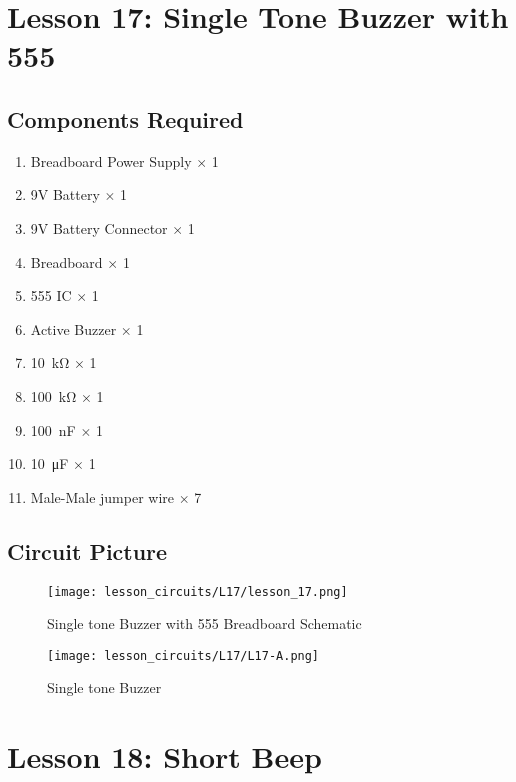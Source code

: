 \section{Lesson 17: Single Tone Buzzer with 555}
\subsection{Components Required}
\begin{enumerate}
    \item Breadboard Power Supply $\times$ 1
    \item 9V Battery $\times$ 1
    \item 9V Battery Connector $\times$ 1
    \item Breadboard $\times$ 1
    \item 555 IC $\times$ 1
    \item Active Buzzer $\times$ 1
    \item \SI{10}{\kilo\ohm} $\times$ 1
    \item \SI{100}{\kilo\ohm} $\times$ 1
    \item \SI{100}{\nano\farad} $\times$ 1
    \item \SI{10}{\micro\farad} $\times$ 1
    \item Male-Male jumper wire $\times$ 7
\end{enumerate}
\subsection{Circuit Picture}
\begin{figure}[!h]
    \centering
    \texttt{[image: lesson\_circuits/L17/lesson\_17.png]}
    \caption{Single tone Buzzer with 555 Breadboard Schematic}
    \label{fig:555_sbuz_sch}
\end{figure}
\begin{figure}[!h]
    \centering
    \texttt{[image: lesson\_circuits/L17/L17-A.png]}
    \caption{Single tone Buzzer}
    \label{fig:555_sbuz_obb}
\end{figure}
\section{Lesson 18: Short Beep}

